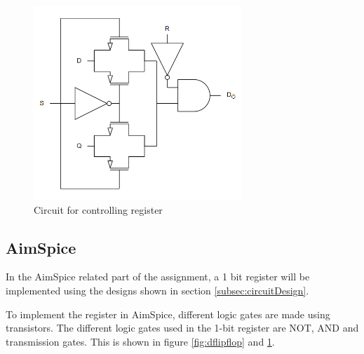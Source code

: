 \begin{figure}[H]
    \centering
    \includegraphics[width=0.7\textwidth]{Figures/setReset.png}
    \caption{Circuit for controlling register}
    \label{fig:setreset}
\end{figure}



\subsection{AimSpice}
In the AimSpice related part of the assignment, a 1 bit register will be implemented using the designs shown in section \ref{subsec:circuitDesign}. 

To implement the register in AimSpice, different logic gates are made using transistors. The different logic gates used in the 1-bit register are NOT, AND and transmission gates. This is shown in figure \ref{fig:dflipflop} and \ref{fig:setreset}.

